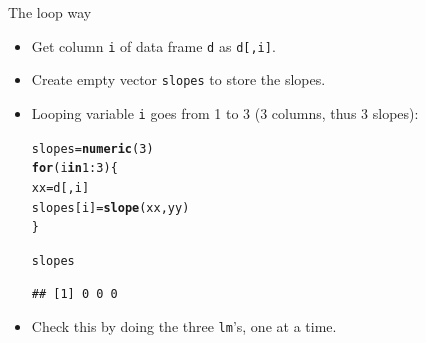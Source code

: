 \documentclass[unknownkeysallowed]{beamer}\usepackage[]{graphicx}\usepackage[]{color}
\makeatletter
\newcommand{\hlnum}[1]{\textcolor[rgb]{0.686,0.059,0.569}{#1}}%
\newcommand{\hlopt}[1]{\textcolor[rgb]{0,0,0}{#1}}%
\newcommand{\hlstd}[1]{\textcolor[rgb]{0.345,0.345,0.345}{#1}}%
\newcommand{\hlkwa}[1]{\textcolor[rgb]{0.161,0.373,0.58}{\textbf{#1}}}%
\newcommand{\hlkwb}[1]{\textcolor[rgb]{0.69,0.353,0.396}{#1}}%
\newcommand{\hlkwd}[1]{\textcolor[rgb]{0.737,0.353,0.396}{\textbf{#1}}}%
\newenvironment{kframe}{%
 \def\at@end@of@kframe{}%
 \ifinner\ifhmode%
  \def\at@end@of@kframe{\end{minipage}}%
  \begin{minipage}{\columnwidth}%
 \fi\fi%
 \def\FrameCommand##1{\hskip\@totalleftmargin \hskip-\fboxsep
 \colorbox{shadecolor}{##1}\hskip-\fboxsep
     \hskip-\linewidth \hskip-\@totalleftmargin \hskip\columnwidth}%
 \MakeFramed {\advance\hsize-\width
   \@totalleftmargin\z@ \linewidth\hsize
   \@setminipage}}%
 {\par\unskip\endMakeFramed%
 \at@end@of@kframe}
\newenvironment{knitrout}{}{} %
\makeatother
\begin{document}
\begin{frame}[fragile]{The loop way}
  
  
  \begin{itemize}
  \item Get column \texttt{i} of data frame \texttt{d} as
    \texttt{d[,i]}.
  \item Create empty vector \texttt{slopes} to store the slopes.
  \item Looping variable \texttt{i} goes from 1 to 3 (3 columns, thus
    3 slopes):
    
\begin{knitrout}
\color{fgcolor}\begin{kframe}
\begin{alltt}
\hlstd{slopes}\hlkwb{=}\hlkwd{numeric}\hlstd{(}\hlnum{3}\hlstd{)}
\hlkwa{for} \hlstd{(i} \hlkwa{in} \hlnum{1}\hlopt{:}\hlnum{3}\hlstd{) \{}
  \hlstd{xx}\hlkwb{=}\hlstd{d[,i]}
  \hlstd{slopes[i]}\hlkwb{=}\hlkwd{slope}\hlstd{(xx,yy)}
\hlstd{\}}
\end{alltt}


{\ttfamily\noindent\bfseries{}}\begin{alltt}
\hlstd{slopes}
\end{alltt}
\begin{verbatim}
## [1] 0 0 0
\end{verbatim}
\end{kframe}
\end{knitrout}
\item Check this by doing the three \texttt{lm}'s, one at a time.
  \end{itemize}
  
\end{frame}
\end{document}
